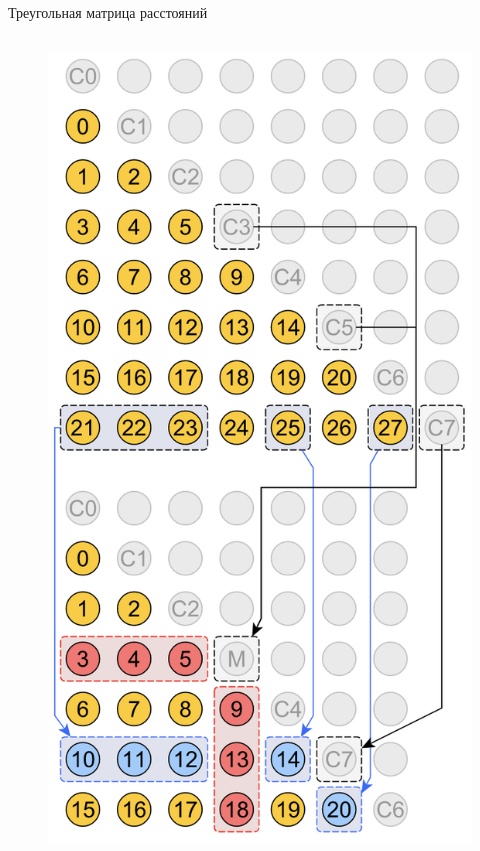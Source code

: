 \documentclass{beamer}
\begin{document}
\begin{frame}{Треугольная матрица расстояний}
\begin{columns}
\begin{figure}
            \includegraphics[height=0.75\textheight]{res/dist_matrix.png}
        \end{figure}
    \end{columns}
\end{frame}
\end{document}
